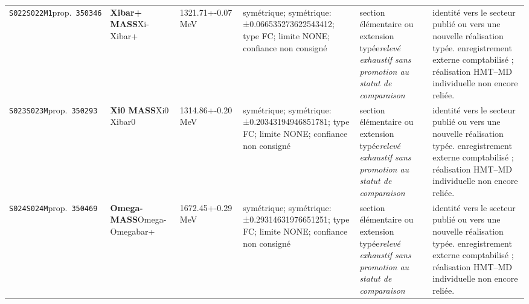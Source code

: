 \begin{landscape}
\begin{longtable}{L{1.85cm}L{4.45cm}L{2.35cm}L{4.05cm}L{3.35cm}L{7.15cm}}
\texttt{S022}\newline \texttt{S022M1}\newline prop.\ \texttt{350346} & \textbf{Xibar+ MASS}\newline Xi- \textbar{}\allowbreak{} Xibar+ & 1321.71+-0.07\,MeV & symétrique; symétrique: ±0.066535273622543412; type FC; limite NONE; confiance non consigné & section élémentaire ou extension typée\newline \emph{relevé exhaustif sans promotion au statut de comparaison} & identité vers le secteur publié ou vers une nouvelle réalisation typée. enregistrement externe comptabilisé ; réalisation HMT--MD individuelle non encore reliée. \\
\texttt{S023}\newline \texttt{S023M}\newline prop.\ \texttt{350293} & \textbf{Xi0 MASS}\newline Xi0 \textbar{}\allowbreak{} Xibar0 & 1314.86+-0.20\,MeV & symétrique; symétrique: ±0.20343194946851781; type FC; limite NONE; confiance non consigné & section élémentaire ou extension typée\newline \emph{relevé exhaustif sans promotion au statut de comparaison} & identité vers le secteur publié ou vers une nouvelle réalisation typée. enregistrement externe comptabilisé ; réalisation HMT--MD individuelle non encore reliée. \\
\texttt{S024}\newline \texttt{S024M}\newline prop.\ \texttt{350469} & \textbf{Omega- MASS}\newline Omega- \textbar{}\allowbreak{} Omegabar+ & 1672.45+-0.29\,MeV & symétrique; symétrique: ±0.29314631976651251; type FC; limite NONE; confiance non consigné & section élémentaire ou extension typée\newline \emph{relevé exhaustif sans promotion au statut de comparaison} & identité vers le secteur publié ou vers une nouvelle réalisation typée. enregistrement externe comptabilisé ; réalisation HMT--MD individuelle non encore reliée. \\

\end{longtable}
\end{landscape}

